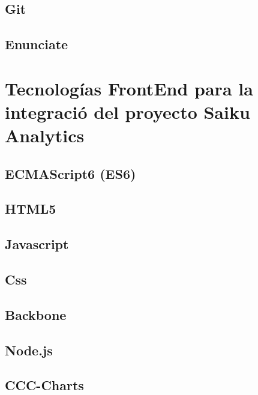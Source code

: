 	\subsection{Git}
	\subsection{Enunciate}
\section{Tecnolog\'{i}as FrontEnd para la integraci\'{o} del proyecto Saiku Analytics}
	\subsection{ECMAScript6 (ES6)}
	\subsection{HTML5}
	\subsection{Javascript}
	\subsection{Css}
	\subsection{Backbone}
	\subsection{Node.js}
	\subsection{CCC-Charts}

		
		
		
		
